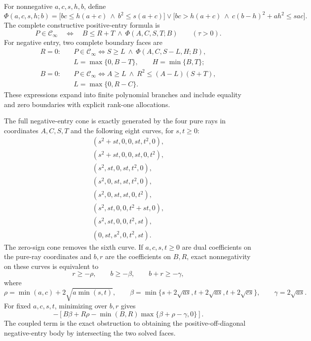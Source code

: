 For nonnegative \(a,c,s,h,b\), define
\[
 \Phi(a,c,s,h;b)=
 \bigl[bc\le h(a+c)\ \wedge\ b^2\le s(a+c)\bigr]
 \vee
 \bigl[bc>h(a+c)\ \wedge\ c(b-h)^2+ah^2\le sac\bigr].
\]
The complete constructive positive-entry formula is
\[
 P\in\mathcal C_\infty
 \quad\Longleftrightarrow\quad
 B\le R+T\ \wedge\ \Phi(A,C,S,T;B)
 \qquad(\tau>0).
\]
For negative entry, two complete boundary faces are
\[
 \begin{aligned}
 R=0:\quad&P\in\mathcal C_\infty
 \Longleftrightarrow
 S\ge L\ \wedge\ \Phi(A,C,S-L,H;B),\\
 &L=\max\{0,B-T\},\qquad H=\min\{B,T\};\\[2mm]
 B=0:\quad&P\in\mathcal C_\infty
 \Longleftrightarrow
 A\ge L\ \wedge\ R^2\le(A-L)(S+T),\\
 &L=\max\{0,R-C\}.
 \end{aligned}
\]
These expressions expand into finite polynomial branches and include equality and zero boundaries with explicit rank-one allocations.

The full negative-entry cone is exactly generated by the four pure rays in coordinates \(A,C,S,T\) and the following eight curves, for \(s,t\ge0\):
\[
\begin{array}{l}
(s^2+st,0,0,st,t^2,0),\\
(s^2+st,0,0,st,0,t^2),\\
(s^2,st,0,st,t^2,0),\\
(s^2,0,st,st,t^2,0),\\
(s^2,0,st,st,0,t^2),\\
(s^2,st,0,0,t^2+st,0),\\
(s^2,st,0,0,t^2,st),\\
(0,st,s^2,0,t^2,st).
\end{array}
\]
The zero-sign cone removes the sixth curve.  If \(a,c,s,t\ge0\) are dual coefficients on the pure-ray coordinates and \(b,r\) are the coefficients on \(B,R\), exact nonnegativity on these curves is equivalent to
\[
 r\ge-\rho,
 \qquad b\ge-\beta,
 \qquad b+r\ge-\gamma,
\]
where
\[
 \rho=\min(a,c)+2\sqrt{a\min(s,t)},
 \qquad
 \beta=\min\{s+2\sqrt{as},t+2\sqrt{as},t+2\sqrt{cs}\},
 \qquad
 \gamma=2\sqrt{as}.
\]
For fixed \(a,c,s,t\), minimizing over \(b,r\) gives
\[
 -\left[B\beta+R\rho-\min(B,R)\max\{\beta+\rho-\gamma,0\}\right].
\]
The coupled term is the exact obstruction to obtaining the positive-off-diagonal negative-entry body by intersecting the two solved faces.
